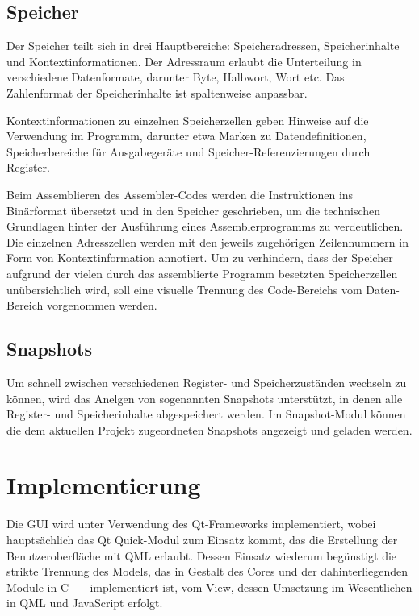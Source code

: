 \subsection{Speicher}

Der Speicher teilt sich in drei Hauptbereiche: Speicheradressen, Speicherinhalte und Kontextinformationen.
Der Adressraum erlaubt die Unterteilung in verschiedene Datenformate, darunter Byte, Halbwort, Wort etc.
Das Zahlenformat der Speicherinhalte ist spaltenweise anpassbar.

Kontextinformationen zu einzelnen Speicherzellen geben Hinweise auf die Verwendung im Programm, darunter etwa Marken zu Datendefinitionen, Speicherbereiche für Ausgabegeräte und Speicher-Referenzierungen durch Register.

Beim Assemblieren des Assembler-Codes werden die Instruktionen ins Binärformat übersetzt und in den Speicher geschrieben, um die technischen Grundlagen hinter der Ausführung eines Assemblerprogramms zu verdeutlichen. Die einzelnen Adresszellen werden mit den jeweils zugehörigen Zeilennummern in Form von Kontextinformation annotiert. Um zu verhindern, dass der Speicher aufgrund der vielen durch das assemblierte Programm besetzten Speicherzellen unübersichtlich wird, soll eine visuelle Trennung des Code-Bereichs vom Daten-Bereich vorgenommen werden.

\subsection{Snapshots}

Um schnell zwischen verschiedenen Register- und Speicherzuständen wechseln zu können, wird das Anelgen von sogenannten Snapshots unterstützt, in denen alle Register- und Speicherinhalte abgespeichert werden. Im Snapshot-Modul können die dem aktuellen Projekt zugeordneten Snapshots angezeigt und geladen werden.


\section{Implementierung}

Die GUI wird unter Verwendung des Qt-Frameworks implementiert, wobei hauptsächlich das Qt Quick-Modul zum Einsatz kommt, das die Erstellung der Benutzeroberfläche mit QML erlaubt. Dessen Einsatz wiederum begünstigt die strikte Trennung des Models, das in Gestalt des Cores und der dahinterliegenden Module in C++ implementiert ist, vom View, dessen Umsetzung im Wesentlichen in QML und JavaScript erfolgt.

